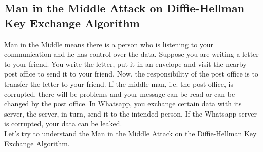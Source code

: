 \documentclass[11pt]{article}
\begin{document}
\subsection{Man in the Middle Attack on Diffie-Hellman Key Exchange Algorithm}
Man in the Middle means there is a person who is listening to your communication and he has control over the data. Suppose you are writing a letter to your friend. You write the letter, put it in an envelope and visit the nearby post office to send it to your friend. Now, the responsibility of the post office is to transfer the letter to your friend. If the middle man, i.e. the post office, is corrupted, there will be problems and your message can be read or can be changed by the post office. In Whatsapp, you exchange certain data with its server, the server, in turn, send it to the intended person. If the Whatsapp server is corrupted, your data can be leaked.\\
\newline
Let's try to understand the Man in the Middle Attack on the Diffie-Hellman Key Exchange Algorithm.
\end{document}
